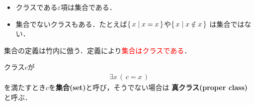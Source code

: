 	\begin{itemize}
		\item クラスである$\varepsilon$項は集合である．
		\item 集合でないクラスもある．たとえば$\left\{\, x \mid x = x\, \right\}$や$\left\{\, x \mid x \notin x\, \right\}$
			は集合ではない．
	\end{itemize}
	
	\vspace{\baselineskip}
	集合の定義は竹内\cite{}に倣う．定義により\textcolor{red}{集合はクラスである}．
	\begin{screen}
		\begin{dfn}[集合]
			クラス$c$が
			\begin{align}
				\exists x\, (\, c = x\, )
			\end{align}
			を満たすとき$c$を{\bf 集合(set)}と呼び，そうでない場合は
			{\bf 真クラス(proper class)}と呼ぶ．
		\end{dfn}
	\end{screen}
	
